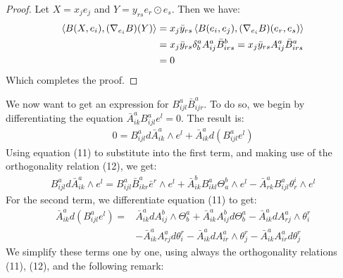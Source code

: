 \begin{proof}  Let $X = x_j e_j$ and $Y = y_{rs} e_r \odot e_s$.  Then we have:
%
\begin{align*}
\left\langle B( X, e_i ), (\nabla_{e_i} B) ( Y ) \right\rangle &= x_j \bar{y}_{rs} \left\langle B(e_i, e_j), ( \nabla_{e_i} B )( e_r, e_s ) \right\rangle \\
&= x_j \bar{y}_{rs} \delta^a_b A^a_{ij} \bar{B}^b_{irs} = x_j \bar{y}_{rs} A^a_{ij} \bar{B}^a_{irs} \\
&= 0
\end{align*}
%
Which completes the proof.
%
\end{proof}

We now want to get an expression for $B^a_{ijl} \bar{B}^a_{ijr}$.  To do so, we begin by differentiating the equation $\bar{A}^a_{ik} B^a_{ijl} e^l = 0$.  The result is:
%
\begin{align*}
0 = B^a_{ijl} d \bar{A}^a_{ik} \wedge e^l + \bar{A}^a_{ik} d( B^a_{ijl} e^l ) 
\end{align*}
%
Using equation (11) to substitute into the first term, and making use of the orthogonality relation (12), we get:
%
\begin{align*}
B^a_{ijl} d \bar{A}^a_{ik} \wedge e^l= B^a_{ijl} \bar{B}^a_{ikr} \bar{e}^r \wedge e^l + \bar{A}^b_{ik} B^a_{ikl} \Theta^b_a \wedge e^l - \bar{A}^a_{rk} B^a_{ijl}  \theta^i_r \wedge e^l
\end{align*}
%
For the second term, we differentiate equation (11) to get:
%
\begin{align*}
\bar{A}^a_{ik} d( B^a_{ijl} e^l ) =& \bar{A}^a_{ik} d A^b_{ij} \wedge \Theta^a_b + \bar{A}^a_{ik} A^b_{ij} d \Theta^a_b - \bar{A}^a_{ik} d
A^a_{rj} \wedge \theta^r_i \\
&- \bar{A}^a_{ik} A^a_{rj} d \theta^r_i - \bar{A}^a_{ik} d A^a_{ir} \wedge \theta^r_j - \bar{A}^a_{ik} A^a_{ir} d \theta^r_j
\end{align*}
%
We simplify these terms one by one, using always the orthogonality relations (11), (12), and the following remark:

